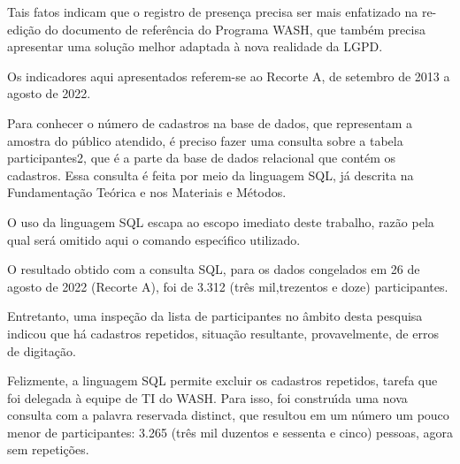 \documentclass[
12pt,		%
openright,	%
twoside,  %
a4paper,			%
chapter=TITLE,		%
english,			%
french,				%
spanish,			%
brazil				%
]{USPSC-classe/USPSC}
\begin{document}
Tais fatos indicam que o registro de presen\c{c}a precisa ser mais enfatizado na re-edi\c{c}\~ao do documento de refer\^encia do Programa WASH, que tamb\'em precisa apresentar uma solu\c{c}\~ao melhor adaptada \`a nova realidade da LGPD.










Os indicadores aqui apresentados referem-se ao Recorte A, de setembro de 2013 a agosto de 2022.










Para conhecer o n\'umero de cadastros na base de dados, que representam a amostra do p\'ublico atendido, \'e preciso fazer uma consulta sobre a tabela \textquotedbl participantes2\textquotedbl , que \'e a parte da base de dados relacional que cont\'em os cadastros. Essa consulta \'e feita por meio da linguagem SQL, j\'a descrita na Fundamenta\c{c}\~ao Te\'orica e nos Materiais e M\'etodos.










O uso da linguagem SQL escapa ao escopo imediato deste trabalho, raz\~ao pela qual ser\'a omitido aqui o comando espec\'{\i}fico utilizado.










O resultado obtido com a consulta SQL, para os dados congelados em 26 de agosto de 2022 (Recorte A), foi de 3.312 (tr\^es mil,trezentos e doze) participantes.










Entretanto, uma inspe\c{c}\~ao da lista de participantes no \^ambito desta pesquisa indicou que h\'a cadastros repetidos, situa\c{c}\~ao resultante, provavelmente, de erros de digita\c{c}\~ao.










Felizmente, a linguagem SQL permite excluir os cadastros repetidos, tarefa que foi delegada \`a equipe de TI do WASH. Para isso, foi constru\'{\i}da uma nova consulta com a palavra reservada \textquotedbl distinct\textquotedbl , que resultou em um n\'umero um pouco menor de participantes: 3.265 (tr\^es mil duzentos e sessenta e cinco) pessoas, agora sem repeti\c{c}\~oes.
\end{document}
